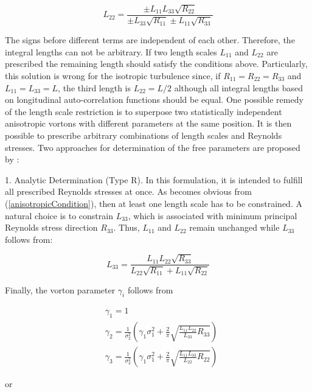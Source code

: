 \begin{equation}
	L_{22} = \frac{\pm L_{11}L_{33}\sqrt{R_{22}}}{\pm L_{33}\sqrt{R_{11}}\pm L_{11}\sqrt{R_{33}}}
\end{equation}


\noindent The signs before different terms are independent of each other. Therefore, the integral lengths can not be arbitrary. If two length scales $L_{11}$ and $L_{22}$ are prescribed the remaining length should satisfy the conditions above. Particularly, this solution is wrong for the isotropic turbulence since, if $R_{11} = R_{22} = R_{33}$ and $L_{11} = L_{33} = L$, the third length is $L_{22} = L/2$ although all integral lengths based on longitudinal auto-correlation functions should be equal. One possible remedy of the length scale restriction is to superpose two statistically independent anisotropic vortons with different parameters at the same position. It is then possible to prescribe arbitrary combinations of length scales and Reynolds stresses. Two approaches for determination of the free parameters are proposed by \cite{kroger2018}:

1. Analytic Determination (Type R). In this formulation, it is intended to fulfill all prescribed Reynolds stresses at once. As becomes obvious from (\ref{anisotropicCondition}), then at least one length scale has to be constrained. A natural choice is to constrain $L_{33}$, which is associated with minimum principal Reynolds stress direction $R_{33}$. Thus, $L_{11}$ and $L_{22}$ remain unchanged while $L_{33}$ follows from:

\begin{equation}
L_{33} = \frac{L_{11}L_{22}\sqrt{R_{33}}}{L_{22}\sqrt{R_{11}}+L_{11}\sqrt{R_{22}}}
\end{equation}

\noindent Finally, the vorton parameter $\gamma_i$ follows from

\begin{equation}
\begin{split}
    &\gamma_1 = 1 \\
    &\gamma_2 = \frac{1}{\sigma_2^2}\left(\gamma_1\sigma_1^2+\frac{2}{\pi}\sqrt{\frac{L_{11}L_{22}}{L_{33}}R_{33}}\right) \\
    &\gamma_3 = \frac{1}{\sigma_3^2}\left(\gamma_1\sigma_1^2+\frac{2}{\pi}\sqrt{\frac{L_{11}L_{33}}{L_{22}}R_{22}}\right)
\end{split}
\end{equation}

\noindent or

